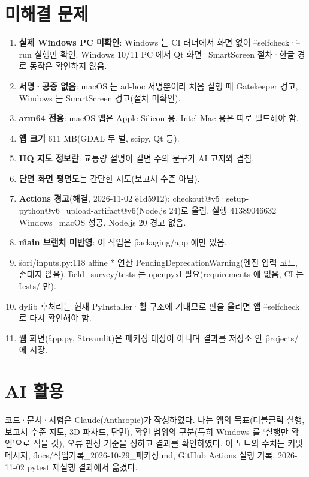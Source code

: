 \documentclass[10.5pt,a4paper]{article}
\begin{document}
\section{미해결 문제}

\begin{enumerate}
\item \textbf{실제 Windows PC 미확인}: Windows 는 CI 러너에서 화면 없이 \f{--selfcheck}·\f{--run} 실행만 확인. Windows 10/11 PC 에서 Qt 화면·SmartScreen 절차·한글 경로 동작은 확인하지 않음.
\item \textbf{서명·공증 없음}: macOS 는 ad-hoc 서명뿐이라 처음 실행 때 Gatekeeper 경고, Windows 는 SmartScreen 경고(절차 미확인).
\item \textbf{arm64 전용}: macOS 앱은 Apple Silicon 용. Intel Mac 용은 따로 빌드해야 함.
\item \textbf{앱 크기} 611 MB(GDAL 두 벌, scipy, Qt 등).
\item \textbf{HQ 지도 정보란}: 교통량 설명이 길면 주의 문구가 AI 고지와 겹침.
\item \textbf{단면 화면 평면도}는 간단한 지도(보고서 수준 아님).
\item \textbf{Actions 경고}(해결, 2026-11-02 \f{e1d5912}): checkout@v5·setup-python@v6·upload-artifact@v6(Node.js 24)로 올림. 실행 41389046632 Windows·macOS 성공, Node.js 20 경고 없음.
\item \textbf{\f{main} 브랜치 미반영}: 이 작업은 \f{packaging/app} 에만 있음.
\item \f{sori/inputs.py:118} affine \f{*} 연산 PendingDeprecationWarning(엔진 입력 코드, 손대지 않음). \f{field\_survey/tests} 는 openpyxl 필요(requirements 에 없음, CI 는 \f{tests/} 만).
\item dylib 후처리는 현재 PyInstaller·휠 구조에 기대므로 판을 올리면 앱 \f{--selfcheck} 로 다시 확인해야 함.
\item 웹 화면(\f{app.py}, Streamlit)은 패키징 대상이 아니며 결과를 저장소 안 \f{projects/} 에 저장.
\end{enumerate}

\section{AI 활용}
코드·문서·시험은 Claude(Anthropic)가 작성하였다. 나는 앱의 목표(더블클릭 실행, 보고서 수준 지도, 3D 파사드, 단면), 확인 범위의 구분(특히 Windows 를 ‘실행만 확인’으로 적을 것), 오류 판정 기준을 정하고 결과를 확인하였다. 이 노트의 수치는 커밋 메시지, \f{docs/작업기록\_2026-10-29\_패키징.md}, GitHub Actions 실행 기록, 2026-11-02 pytest 재실행 결과에서 옮겼다.
\end{document}
